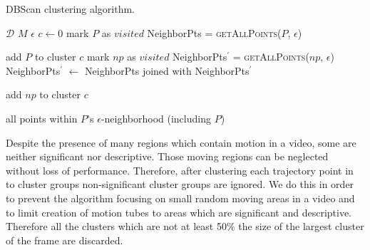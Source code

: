 \begin{algorithm}
 \caption{DBScan clustering algorithm.}
   \label{alg:Clustering algorithm}
    \begin{algorithmic}[1]
    \Require  $\mathcal{D}$ 
    \Require $M$ 
    \Require $\epsilon$ 
        \State $c \leftarrow 0$ 
	  \EndIf
            \State mark $P$ as $visited$
            \State NeighborPts = \textsc{getAllPoints}($P$, $\epsilon$)
          \Else
          \EndIf
        \EndFor

	\State add $P$ to cluster $c$
	    \State mark $np$ as $visited$
	    \State NeighborPts$^\prime$ = \textsc{getAllPoints}($np$, $\epsilon$)
            \State NeighborPts$^\prime$ $\leftarrow$ NeighborPts joined with NeighborPts$^\prime$
            \EndIf
	
	  \EndIf
         \State add $np$ to cluster $c$
         \EndIf
	\EndFor
       \EndFunction

       \Return all points within $P$'s $\epsilon$-neighborhood (including $P$)
       \EndFunction
\end{algorithmic}

\end{algorithm}


Despite the presence of many regions which contain motion in a video, some are neither significant nor descriptive.
Those moving regions can be neglected without loss of performance. Therefore, after clustering each trajectory point in to cluster groups non-significant cluster groups are ignored.
We do this in order to prevent the algorithm focusing on small random moving areas in a video and to limit creation of motion tubes to areas which are significant and descriptive.
Therefore all the clusters which are not at least 50\% the size of the largest cluster of the frame are discarded.

